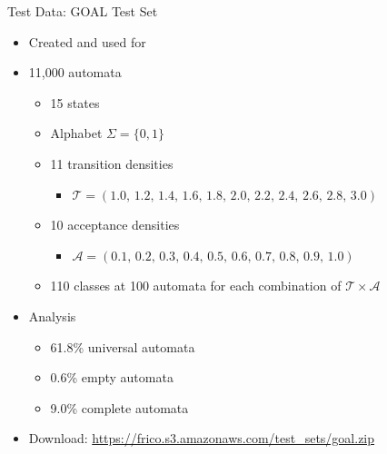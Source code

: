 \documentclass[12pt,handout]{beamer}
\begin{document}
\begin{frame}{Test Data: GOAL Test Set}
\begin{itemize}
\item Created and used for~\cite{2011_tsai}
\item 11,000 automata
  \begin{itemize}
  \item 15 states
  \item Alphabet $\Sigma = \{0, 1\}$
  \item 11 transition densities
    \begin{itemize}
    \item $\mathcal T=(1.0,\,1.2,\,1.4,\,1.6,\,1.8,\,2.0,\,2.2,\,2.4,\,2.6,\,2.8,\,3.0)$
    \end{itemize}
  \item 10 acceptance densities
    \begin{itemize}
    \item $\mathcal A=(0.1,\,0.2,\,0.3,\,0.4,\,0.5,\,0.6,\,0.7,\,0.8,\,0.9,\,1.0)$
    \end{itemize}
  \item 110 classes at 100 automata for each combination of $\mathcal T \times \mathcal A$
  \end{itemize}
\pause
\item Analysis
  \begin{itemize}
  \item 61.8\% universal automata
  \item 0.6\% empty automata
  \item 9.0\% complete automata
  \end{itemize}
\pause
\item Download: \url{https://frico.s3.amazonaws.com/test_sets/goal.zip}
\end{itemize}
\end{frame}
\end{document}
